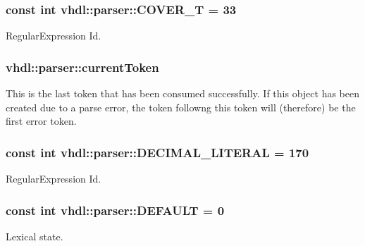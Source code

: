 \subsubsection[{C\+O\+V\+E\+R\+\_\+\+T}]{\setlength{\rightskip}{0pt plus 5cm}const int vhdl\+::parser\+::\+C\+O\+V\+E\+R\+\_\+\+T = 33}\label{namespacevhdl_1_1parser_a6e37d38efdb4b8fd964ee4621288da69}
Regular\+Expression Id. \hypertarget{namespacevhdl_1_1parser_a755fe3544d80cddda9e786987778a339}{}
\subsubsection[{current\+Token}]{ vhdl\+::parser\+::current\+Token}\label{namespacevhdl_1_1parser_a755fe3544d80cddda9e786987778a339}
This is the last token that has been consumed successfully. If this object has been created due to a parse error, the token followng this token will (therefore) be the first error token. \hypertarget{namespacevhdl_1_1parser_a335a282402d206729ac56d9506eb2d12}{}
\subsubsection[{D\+E\+C\+I\+M\+A\+L\+\_\+\+L\+I\+T\+E\+R\+A\+L}]{\setlength{\rightskip}{0pt plus 5cm}const int vhdl\+::parser\+::\+D\+E\+C\+I\+M\+A\+L\+\_\+\+L\+I\+T\+E\+R\+A\+L = 170}\label{namespacevhdl_1_1parser_a335a282402d206729ac56d9506eb2d12}
Regular\+Expression Id. \hypertarget{namespacevhdl_1_1parser_a66854f59b1822b212fcabd7b53431cf8}{}
\subsubsection[{D\+E\+F\+A\+U\+L\+T}]{\setlength{\rightskip}{0pt plus 5cm}const int vhdl\+::parser\+::\+D\+E\+F\+A\+U\+L\+T = 0}\label{namespacevhdl_1_1parser_a66854f59b1822b212fcabd7b53431cf8}
Lexical state. \hypertarget{namespacevhdl_1_1parser_aed0e3608c4ee544044df8eeca01d17a0}{}
